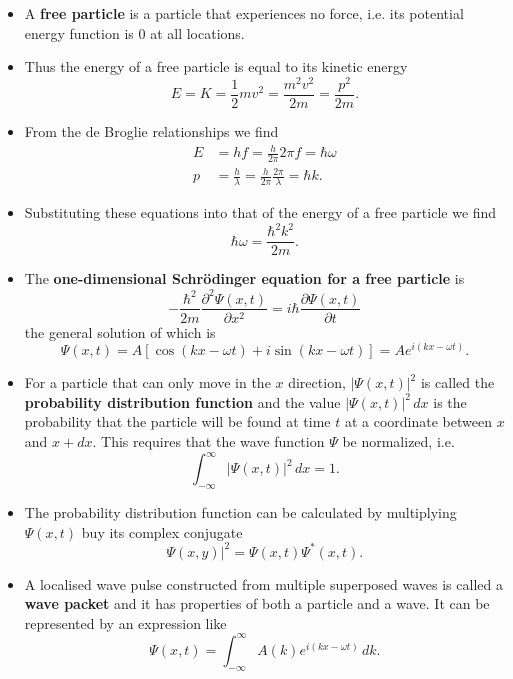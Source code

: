 \documentclass{article}
\begin{document}
\begin{itemize}
  \item A \textbf{free particle} is a particle that experiences no force, i.e. its potential energy function is $0$ at all locations.

  \item Thus the energy of a free particle is equal to its kinetic energy \[E = K = \frac{1}{2} m v^2 = \frac{m^2 v^2}{2 m} = \frac{p^2}{2 m}.\]

  \item From the de Broglie relationships we find \begin{align*}
          E & = h f = \frac{h}{2 \pi} 2 \pi f = \hbar \omega                         \\
          p & = \frac{h}{\lambda} = \frac{h}{2 \pi} \frac{2 \pi}{\lambda} = \hbar k.
        \end{align*}

  \item Substituting these equations into that of the energy of a free particle we find \[\hbar \omega = \frac{\hbar^2 k^2}{2 m}.\]

\item The \textbf{one-dimensional Schrödinger equation for a free particle} is \[-\frac{\hbar^2}{2 m} \frac{\partial^2 \Psi(x, t)}{\partial x^2} = i \hbar \frac{\partial \Psi(x, t)}{\partial t}\] the general solution of which is \[\Psi(x, t) =  A[\cos (k x - \omega t) + i \sin (k x - \omega t)] = A e^{i (k x - \omega t)}.\]

  \item For a particle that can only move in the $x$ direction, $|\Psi(x, t)|^2$ is called the \textbf{probability distribution function} and the value $|\Psi(x, t)|^2 \,dx$ is the probability that the particle will be found at time $t$ at a coordinate between $x$ and $x + dx$. This requires that the wave function $\Psi$ be normalized, i.e. \[\int_{-\infty}^\infty |\Psi(x, t)|^2 \,dx = 1.\]

  \item The probability distribution function can be calculated by multiplying $\Psi(x, t)$ buy its complex conjugate \[\Psi(x, y)|^2 = \Psi(x, t) \Psi^*(x, t).\]

  \item A localised wave pulse constructed from multiple superposed waves is called a \textbf{wave packet} and it has properties of both a particle and a wave. It can be represented by an expression like \[\Psi(x, t) = \int_{-\infty}^\infty A(k) e^{i (k x - \omega t)} \,dk.\]


\end{itemize}
\end{document}
